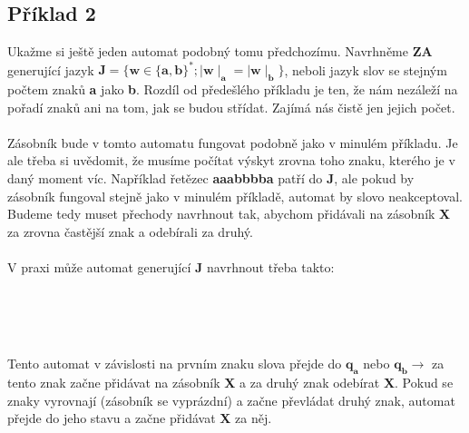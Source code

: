 \documentclass{report}
\begin{document}
\subsection*{Příklad 2}
Ukažme si ještě jeden automat podobný tomu předchozímu. Navrhněme \textbf{ZA} generující jazyk $\mathbf{J = \{w\in\{a,b\}^* ; \mid{w}\mid_a=\mid{w}\mid_b\}}$, neboli jazyk slov se stejným počtem znaků \textbf{a} jako \textbf{b}. Rozdíl od předešlého příkladu je ten, že nám nezáleží na pořadí znaků ani na tom, jak se budou střídat. Zajímá nás čistě jen jejich počet.\\ \\
Zásobník bude v tomto automatu fungovat podobně jako v minulém příkladu. Je ale třeba si uvědomit, že musíme počítat výskyt zrovna toho znaku, kterého je v daný moment víc. Například řetězec \textbf{aaabbbba} patří do \textbf{J}, ale pokud by zásobník fungoval stejně jako v minulém příkladě, automat by slovo neakceptoval. Budeme tedy muset přechody navrhnout tak, abychom přidávali na zásobník \textbf{X} za zrovna častější znak a odebírali za druhý.\\ \\
V praxi může automat generující \textbf{J} navrhnout třeba takto:\\ \\
\begin{center}
\\ \\
\end{center}
Tento automat v závislosti na prvním znaku slova přejde do $\mathbf{q_a}$ nebo $\mathbf{q_b \rightarrow}$ za tento znak začne přidávat na zásobník \textbf{X} a za druhý znak odebírat \textbf{X}. Pokud se znaky vyrovnají (zásobník se vyprázdní) a začne převládat druhý znak, automat přejde do jeho stavu a začne přidávat \textbf{X} za něj.\\ \\
\end{document}
